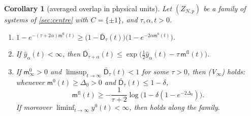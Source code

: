 \documentclass[11pt,a4paper]{amsart}
\newtheorem{corollary}[theorem]{Corollary}
\theoremstyle{definition}
\theoremstyle{remark}
\numberwithin{equation}{section}
\newcommand{\Mcirc}{\text{\upshape(M$^{\circ}$)}}   %
\begin{document}
\begin{corollary}[averaged overlap in physical units]\label{cor:overlap-physical}
Let $(Z_{N,p})$ be a family of systems of \cref{sec:centre} with $C=\{\pm1\}$, and $\tau,\alpha,t>0$.
\begin{enumerate}[label=\textup{(\alph*)},leftmargin=*]
\item $1-e^{-(\tau+2\alpha)\mathsf m^{\mathrm{fl}}(t)}\ge\bigl(1-\bar{\mathsf D}_\tau(t)\bigr)\bigl(1-e^{-2\alpha\mathsf m^0(t)}\bigr)$.
\item If $\hat y_\alpha(t)<\infty$, then $\bar{\mathsf D}_{\tau+\alpha}(t)\le\exp\bigl(\tfrac12\hat y_\alpha(t)-\tau\,\mathsf m^{\mathrm{fl}}(t)\bigr)$.
\item If $\mathsf m^0_\infty>0$ and $\limsup_{t\to\infty}\bar{\mathsf D}_\tau(t)<1$ for some $\tau>0$, then \textup{(V$_\infty$)} holds: whenever $\mathsf m^0(t)\ge\Delta_0>0$ and $\bar{\mathsf D}_\tau(t)\le1-\delta$,
\[
\mathsf m^{\mathrm{fl}}(t)\ge-\frac1{\tau+2}\log\bigl(1-\delta(1-e^{-2\Delta_0})\bigr).
\]
If moreover $\liminf_{t\to\infty}y^0(t)<\infty$, then \Mcirc{} holds along the family.
\end{enumerate}
\end{corollary}
\end{document}
